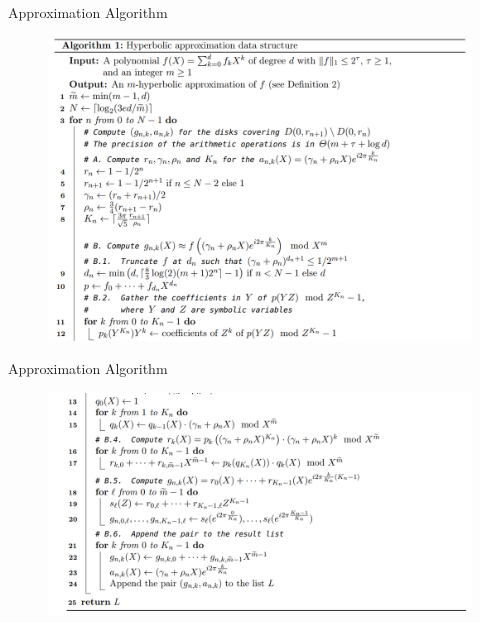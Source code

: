 \begin{frame}{Approximation Algorithm}
    \begin{figure}
        \centering
        \includegraphics[scale=0.25]{Project Files/algo-1.png}
        \label{fig:enter-label}
    \end{figure}

    \blfootnote{[Mor21]}
\end{frame}

\begin{frame}{Approximation Algorithm}
    \begin{figure}
        \centering
        \includegraphics[scale=0.25]{Project Files/algo-2.png}
        \label{fig:enter-label}
    \end{figure}

    \blfootnote{[Mor21]}
\end{frame}

